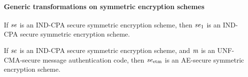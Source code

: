 \paragraph{Generic transformations on symmetric encryption schemes}
\begin{theorem}
  If $\mathit{{se}}$ is an IND-CPA secure symmetric encryption scheme, then $\mathit{{se}}_1$ is an IND-CPA secure symmetric encryption scheme.
  \begin{center}
    \begin{theorem}[AE]
      If $\mathit{{se}}$ is an IND-CPA secure symmetric encryption scheme, and $\mathit{{m}}$ is an UNF-CMA-secure message authentication code, then
      $\mathit{{se}}_{\text{etm}}$ is an AE-secure symmetric encryption scheme.
    \end{theorem}

    \begin{pchstack}
      \pcvspace
      \pchspace
      \pchspace
    \end{pchstack}
  \end{center}

\end{theorem}